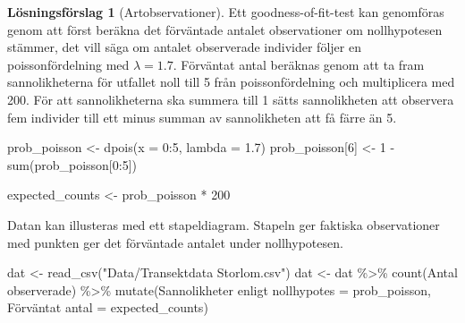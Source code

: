 \documentclass[
]{book}
\newenvironment{Shaded}{\begin{snugshade}}{\end{snugshade}}
\newcommand{\AttributeTok}[1]{\textcolor[rgb]{0.77,0.63,0.00}{#1}}
\newcommand{\DecValTok}[1]{\textcolor[rgb]{0.00,0.00,0.81}{#1}}
\newcommand{\FloatTok}[1]{\textcolor[rgb]{0.00,0.00,0.81}{#1}}
\newcommand{\FunctionTok}[1]{\textcolor[rgb]{0.00,0.00,0.00}{#1}}
\newcommand{\NormalTok}[1]{#1}
\newcommand{\OtherTok}[1]{\textcolor[rgb]{0.56,0.35,0.01}{#1}}
\newcommand{\SpecialCharTok}[1]{\textcolor[rgb]{0.00,0.00,0.00}{#1}}
\newcommand{\StringTok}[1]{\textcolor[rgb]{0.31,0.60,0.02}{#1}}
\theoremstyle{definition}
\theoremstyle{definition}
\theoremstyle{definition}
\theoremstyle{definition}
\newtheorem{hypothesis}{Lösningsförslag}[chapter]
\theoremstyle{remark}
\begin{document}
\begin{hypothesis}[Artobservationer]
Ett goodness-of-fit-test kan genomföras genom att först beräkna det förväntade antalet observationer om nollhypotesen stämmer, det vill säga om antalet observerade individer följer en poissonfördelning med \(\lambda = 1.7\).
Förväntat antal beräknas genom att ta fram sannolikheterna för utfallet noll till 5 från poissonfördelning och multiplicera med 200.
För att sannolikheterna ska summera till 1 sätts sannolikheten att observera fem individer till ett minus summan av sannolikheten att få färre än 5.

\begin{Shaded}
\begin{Highlighting}[]
\NormalTok{prob\_poisson }\OtherTok{\textless{}{-}} \FunctionTok{dpois}\NormalTok{(}\AttributeTok{x =} \DecValTok{0}\SpecialCharTok{:}\DecValTok{5}\NormalTok{, }\AttributeTok{lambda =} \FloatTok{1.7}\NormalTok{)}
\NormalTok{prob\_poisson[}\DecValTok{6}\NormalTok{] }\OtherTok{\textless{}{-}} \DecValTok{1} \SpecialCharTok{{-}} \FunctionTok{sum}\NormalTok{(prob\_poisson[}\DecValTok{0}\SpecialCharTok{:}\DecValTok{5}\NormalTok{])}

\NormalTok{expected\_counts }\OtherTok{\textless{}{-}}\NormalTok{ prob\_poisson }\SpecialCharTok{*} \DecValTok{200}
\end{Highlighting}
\end{Shaded}

Datan kan illusteras med ett stapeldiagram. Stapeln ger faktiska observationer med punkten ger det förväntade antalet under nollhypotesen.

\begin{Shaded}
\begin{Highlighting}[]
\NormalTok{dat }\OtherTok{\textless{}{-}} \FunctionTok{read\_csv}\NormalTok{(}\StringTok{"Data/Transektdata Storlom.csv"}\NormalTok{)}
\NormalTok{dat }\OtherTok{\textless{}{-}}\NormalTok{ dat }\SpecialCharTok{\%\textgreater{}\%} 
  \FunctionTok{count}\NormalTok{(}\StringTok{\textasciigrave{}}\AttributeTok{Antal observerade}\StringTok{\textasciigrave{}}\NormalTok{) }\SpecialCharTok{\%\textgreater{}\%} 
  \FunctionTok{mutate}\NormalTok{(}\StringTok{\textasciigrave{}}\AttributeTok{Sannolikheter enligt nollhypotes}\StringTok{\textasciigrave{}} \OtherTok{=}\NormalTok{ prob\_poisson,}
         \StringTok{\textasciigrave{}}\AttributeTok{Förväntat antal}\StringTok{\textasciigrave{}} \OtherTok{=}\NormalTok{ expected\_counts)}


\end{Highlighting}
\end{Shaded}
\end{hypothesis}
\end{document}
